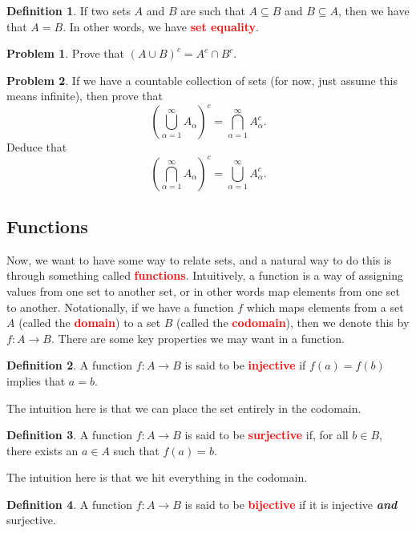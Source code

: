 \documentclass{book}
\theoremstyle{definition}
\newtheorem{problem}{Problem}
\numberwithin{problem}{chapter}
\numberwithin{solution}{chapter}
\numberwithin{theorem}{chapter}
\newtheorem{definition}{Definition}
\numberwithin{definition}{chapter}
\numberwithin{example}{chapter}
\numberwithin{remark}{chapter}
\numberwithin{claim}{chapter}
\numberwithin{fact}{chapter}
\numberwithin{preliminary}{chapter}
\numberwithin{corollary}{theorem}
\numberwithin{lemma}{chapter}
\numberwithin{proposition}{chapter}
\newcommand{\deff}[1]{\textbf{\textcolor{red}{#1}}}
\begin{document}
\begin{definition} 
If two sets $A$ and $B$ are such that $A \subseteq B$ and $B \subseteq A$, then we have that $A = B$. In other words, we have \deff{set equality}. 
\end{definition}

\begin{problem}
Prove that $(A \cup B)^c = A^c \cap B^c$.
\end{problem}

\begin{problem}
If we have a countable collection of sets (for now, just assume this means infinite), then prove that 
\[ \left( \bigcup_{\alpha = 1}^\infty A_\alpha \right)^c = \bigcap_{\alpha=1}^\infty A_\alpha^c.  \]
Deduce that 
\[ \left( \bigcap_{\alpha=1}^\infty A_\alpha \right)^c = \bigcup_{\alpha=1}^\infty A_\alpha^c.\]
\end{problem}

\subsection{Functions}

Now, we want to have some way to relate sets, and a natural way to do this is through something called \deff{functions}. Intuitively, a function is a way of assigning values from one set to another set, or in other words map elements from one set to another. Notationally, if we have a function $f$ which maps elements from a set $A$ (called the \deff{domain}) to a set $B$ (called the \deff{codomain}), then we denote this by $f : A \rightarrow B$.  There are some key properties we may want in a function.

\begin{definition} 
A function $f: A \rightarrow B$ is said to be \deff{injective} if $f(a) = f(b)$ implies that $a = b$.
\end{definition}

The intuition here is that we can place the set entirely in the codomain.

\begin{definition} 
A function $f : A \rightarrow B$ is said to be \deff{surjective} if, for all $b \in B$, there exists an $a \in A$ such that $f(a) = b$.
\end{definition}

The intuition here is that we hit everything in the codomain.

\begin{definition} 
A function $f : A \rightarrow B$ is said to be \deff{bijective} if it is injective \textbf{\textit{and}} surjective.
\end{definition}
\end{document}
